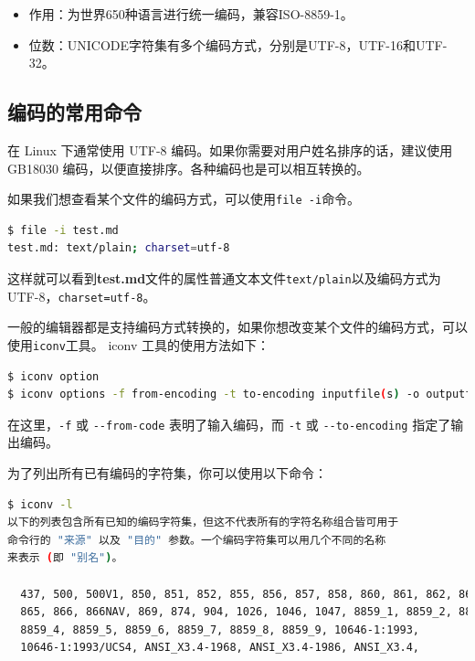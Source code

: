 \documentclass[doctor,openright,twoside]{sjtuthesis}
\providecommand{\tightlist}{%
    \setlength{\itemsep}{0pt}\setlength{\parskip}{0pt}}
\newcommand{\passthrough}[1]{#1}
\theoremstyle{plain}
\theoremstyle{definition}
\theoremstyle{remark}
\theoremstyle{ocrenumbox}
\theoremstyle{plain}
\begin{document}
\begin{itemize}
\tightlist
\item
  作用：为世界650种语言进行统一编码，兼容ISO-8859-1。
\item
  位数：UNICODE字符集有多个编码方式，分别是UTF-8，UTF-16和UTF-32。
\end{itemize}

\subsection{编码的常用命令}

在 Linux 下通常使用 UTF-8 编码。如果你需要对用户姓名排序的话，建议使用
GB18030 编码，以便直接排序。各种编码也是可以相互转换的。

如果我们想查看某个文件的编码方式，可以使用\passthrough{\lstinline!file -i!}命令。

\begin{lstlisting}[language=bash]
$ file -i test.md
test.md: text/plain; charset=utf-8
\end{lstlisting}

这样就可以看到\textbf{test.md}文件的属性普通文本文件\passthrough{\lstinline!text/plain!}以及编码方式为UTF-8，\passthrough{\lstinline!charset=utf-8!}。

一般的编辑器都是支持编码方式转换的，如果你想改变某个文件的编码方式，可以使用\passthrough{\lstinline!iconv!}工具。
iconv 工具的使用方法如下：

\begin{lstlisting}[language=bash]
$ iconv option
$ iconv options -f from-encoding -t to-encoding inputfile(s) -o outputfile 
\end{lstlisting}

在这里，\passthrough{\lstinline!-f!} 或
\passthrough{\lstinline!--from-code!} 表明了输入编码，而
\passthrough{\lstinline!-t!} 或 \passthrough{\lstinline!--to-encoding!}
指定了输出编码。

为了列出所有已有编码的字符集，你可以使用以下命令：

\begin{lstlisting}[language=bash]
$ iconv -l
以下的列表包含所有已知的编码字符集，但这不代表所有的字符名称组合皆可用于
命令行的 "来源" 以及 "目的" 参数。一个编码字符集可以用几个不同的名称
来表示 (即 "别名")。

  437, 500, 500V1, 850, 851, 852, 855, 856, 857, 858, 860, 861, 862, 863, 864,
  865, 866, 866NAV, 869, 874, 904, 1026, 1046, 1047, 8859_1, 8859_2, 8859_3,
  8859_4, 8859_5, 8859_6, 8859_7, 8859_8, 8859_9, 10646-1:1993,
  10646-1:1993/UCS4, ANSI_X3.4-1968, ANSI_X3.4-1986, ANSI_X3.4,
\end{lstlisting}
\end{document}
